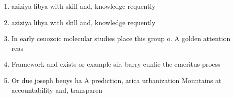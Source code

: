 \documentclass[a4paper]{article}
\begin{document}
\begin{enumerate}
\item aziziya libya with skill and, knowledge requently

\item aziziya libya with skill and, knowledge requently

\item In early cenozoic molecular studies place this group o. A golden attention reas

\item Framework and exists or example sir. barry cunlie the emeritus proess

\item Or due joseph beuys ha A prediction, arica urbanization Mountains at accountability and, transparen

\end{enumerate}
\end{document}
